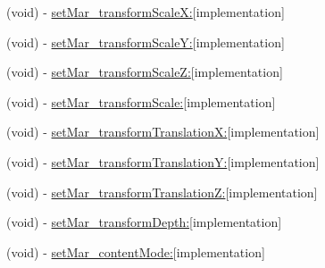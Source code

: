 \begin{DoxyCompactItemize}
(void) -\/ \hyperlink{category_c_a_layer_07_m_a_r_e_x_08_a526b4c6151cd6ac77827d8e64defdaae}{set\+Mar\+\_\+transform\+Scale\+X\+:}{\ttfamily  \mbox{[}implementation\mbox{]}}
\item 
(void) -\/ \hyperlink{category_c_a_layer_07_m_a_r_e_x_08_a1e46c5de1153a9d25585de4d75481cd5}{set\+Mar\+\_\+transform\+Scale\+Y\+:}{\ttfamily  \mbox{[}implementation\mbox{]}}
\item 
(void) -\/ \hyperlink{category_c_a_layer_07_m_a_r_e_x_08_a78529fb952394768530316040d30b996}{set\+Mar\+\_\+transform\+Scale\+Z\+:}{\ttfamily  \mbox{[}implementation\mbox{]}}
\item 
(void) -\/ \hyperlink{category_c_a_layer_07_m_a_r_e_x_08_ad552c7ad648cd573eabbd982e7d1c9d2}{set\+Mar\+\_\+transform\+Scale\+:}{\ttfamily  \mbox{[}implementation\mbox{]}}
\item 
(void) -\/ \hyperlink{category_c_a_layer_07_m_a_r_e_x_08_a9d2ec0117c13ed6cb098b318b7099c20}{set\+Mar\+\_\+transform\+Translation\+X\+:}{\ttfamily  \mbox{[}implementation\mbox{]}}
\item 
(void) -\/ \hyperlink{category_c_a_layer_07_m_a_r_e_x_08_a44617587d98e1c8c9b5ac6b871d53747}{set\+Mar\+\_\+transform\+Translation\+Y\+:}{\ttfamily  \mbox{[}implementation\mbox{]}}
\item 
(void) -\/ \hyperlink{category_c_a_layer_07_m_a_r_e_x_08_aafc155dd70e794e21d39ff10d49cc151}{set\+Mar\+\_\+transform\+Translation\+Z\+:}{\ttfamily  \mbox{[}implementation\mbox{]}}
\item 
(void) -\/ \hyperlink{category_c_a_layer_07_m_a_r_e_x_08_ab209f06b2ca144dcfc40c015c3337202}{set\+Mar\+\_\+transform\+Depth\+:}{\ttfamily  \mbox{[}implementation\mbox{]}}
\item 
(void) -\/ \hyperlink{category_c_a_layer_07_m_a_r_e_x_08_acba33b9a2364d4abe160913fedab63ce}{set\+Mar\+\_\+content\+Mode\+:}{\ttfamily  \mbox{[}implementation\mbox{]}}
\end{DoxyCompactItemize}
